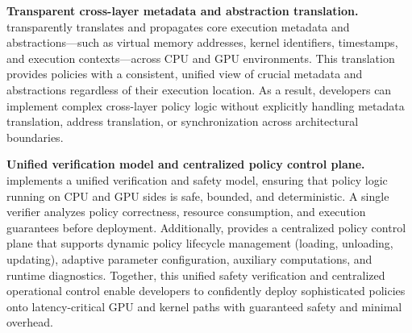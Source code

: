 \textbf{Transparent cross-layer metadata and abstraction translation.}
\sys transparently translates and propagates core execution metadata and abstractions---such as virtual memory addresses, kernel identifiers, timestamps, and execution contexts---across CPU and GPU environments. This translation provides policies with a consistent, unified view of crucial metadata and abstractions regardless of their execution location. As a result, developers can implement complex cross-layer policy logic without explicitly handling metadata translation, address translation, or synchronization across architectural boundaries.

\textbf{Unified verification model and centralized policy control plane.}
\sys implements a unified verification and safety model, ensuring that policy logic running on CPU and GPU sides is safe, bounded, and deterministic. A single verifier analyzes policy correctness, resource consumption, and execution guarantees before deployment. Additionally, \sys provides a centralized policy control plane that supports dynamic policy lifecycle management (loading, unloading, updating), adaptive parameter configuration, auxiliary computations, and runtime diagnostics. Together, this unified safety verification and centralized operational control enable developers to confidently deploy sophisticated policies onto latency-critical GPU and kernel paths with guaranteed safety and minimal overhead.